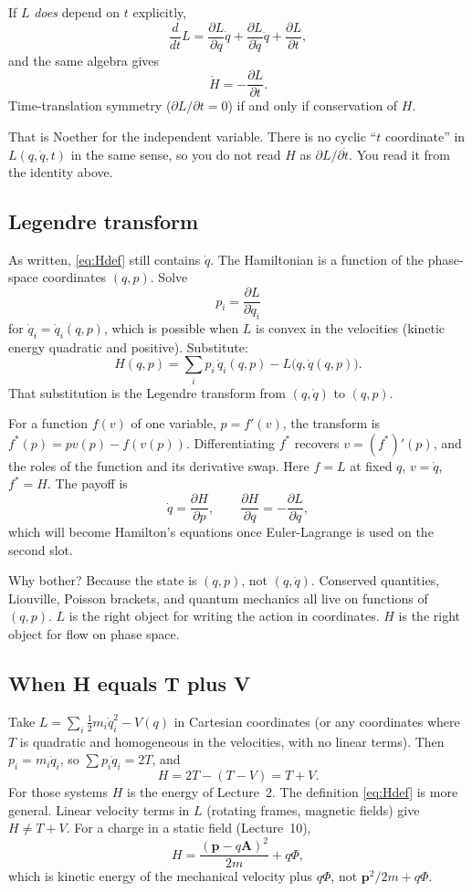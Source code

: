 \documentclass[11pt]{article}
\numberwithin{equation}{section}
\newcommand{\qdot}{\dot{q}}
\newcommand{\ddt}{\frac{d}{dt}}
\newcommand{\pd}[2]{\frac{\partial #1}{\partial #2}}
\newcommand{\vect}[1]{\mathbf{#1}}
\begin{document}
If $L$ \emph{does} depend on $t$ explicitly,
\[
\ddt L = \pd{L}{q}\qdot + \pd{L}{\qdot}\ddot q + \pd{L}{t},
\]
and the same algebra gives
\[
\dot H = -\pd{L}{t}.
\]
Time-translation symmetry ($\partial L/\partial t=0$) if and only if conservation of $H$.

That is Noether for the independent variable. There is no cyclic ``$t$ coordinate'' in $L(q,\qdot,t)$ in the same sense, so you do not read $H$ as $\partial L/\partial\dot t$. You read it from the identity above.

\subsection{Legendre transform}

As written, \eqref{eq:Hdef} still contains $\qdot$. The Hamiltonian is a function of the phase-space coordinates $(q,p)$. Solve
\[
p_i = \pd{L}{\qdot_i}
\]
for $\qdot_i=\qdot_i(q,p)$, which is possible when $L$ is convex in the velocities (kinetic energy quadratic and positive). Substitute:
\[
H(q,p) = \sum_i p_i\,\qdot_i(q,p) - L\bigl(q,\qdot(q,p)\bigr).
\]
That substitution is the Legendre transform from $(q,\qdot)$ to $(q,p)$.

For a function $f(v)$ of one variable, $p=f'(v)$, the transform is $f^*(p)=p v(p)-f(v(p))$. Differentiating $f^*$ recovers $v=(f^*)'(p)$, and the roles of the function and its derivative swap. Here $f=L$ at fixed $q$, $v=\qdot$, $f^*=H$. The payoff is
\[
\qdot = \pd{H}{p},\qquad
\pd{H}{q} = -\pd{L}{q},
\]
which will become Hamilton's equations once Euler-Lagrange is used on the second slot.

Why bother? Because the state is $(q,p)$, not $(q,\qdot)$. Conserved quantities, Liouville, Poisson brackets, and quantum mechanics all live on functions of $(q,p)$. $L$ is the right object for writing the action in coordinates. $H$ is the right object for flow on phase space.

\subsection{When H equals T plus V}

Take $L=\sum_i \tfrac12 m_i\dot q_i^2 - V(q)$ in Cartesian coordinates (or any coordinates where $T$ is quadratic and homogeneous in the velocities, with no linear terms). Then $p_i=m_i\qdot_i$, so $\sum p_i\qdot_i=2T$, and
\[
H = 2T - (T-V) = T+V.
\]
For those systems $H$ is the energy of Lecture~2. The definition \eqref{eq:Hdef} is more general. Linear velocity terms in $L$ (rotating frames, magnetic fields) give $H\neq T+V$. For a charge in a static field (Lecture~10),
\[
H = \frac{(\vect{p}-q\vect{A})^2}{2m} + q\Phi,
\]
which is kinetic energy of the mechanical velocity plus $q\Phi$, not $\vect{p}^2/2m+q\Phi$.
\end{document}
